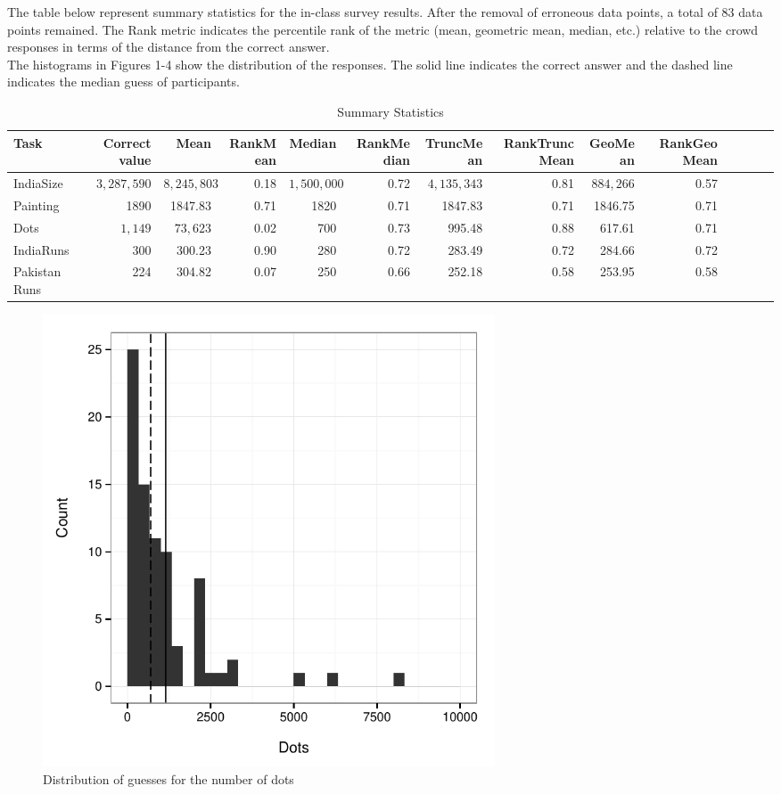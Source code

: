 \documentclass{article}
\begin{document}
The table below represent summary statistics for the in-class survey results. After the removal of erroneous data points, a total of 83 data points remained. The Rank metric indicates the percentile rank of the metric (mean, geometric mean, median, etc.) relative to the crowd responses in terms of the distance from the correct answer. \\

The histograms in Figures 1-4 show the distribution of the responses. The solid line indicates the correct answer and the dashed line indicates the median guess of participants.


\begin{table}[h]
\begin{adjustbox}{max width=\textwidth}
\begin{tabular}{|l||r|r||r|r|r|r|r|r|r|r|r|r|r}
\hline
Task & Correct value & Mean & RankMean & Median & RankMedian & TruncMean & RankTruncMean & GeoMean & RankGeoMean \\
\hline
IndiaSize & $3,287,590$ & $8,245,803$ & 0.18 & $1,500,000$ & 0.72 & $4,135,343$ & 0.81 & $884,266$ & 0.57 \\
Painting & 1890 & 1847.83 & 0.71 & 1820 & 0.71 & 1847.83 & 0.71 & 1846.75 & 0.71 \\
Dots & $1,149$ & $73,623$ & 0.02 & 700 & 0.73 & 995.48 & 0.88 & 617.61 & 0.71\\
IndiaRuns & 300 & 300.23 & 0.90 & 280 & 0.72 & 283.49 &     0.72 & 284.66 & 0.72\\
PakistanRuns & 224 & 304.82 & 0.07 & 250 & 0.66 &     252.18 & 0.58 & 253.95 & 0.58  \\
\hline
\end{tabular}
\end{adjustbox}
\caption{Summary Statistics}
\label{stats}
\end{table} 


				
\newpage

\begin{figure}
\begin{center}
\includegraphics[width=0.65\textwidth]{../../output/inClass_exp/dots.pdf}
\caption{Distribution of guesses for the number of dots}
\label{nrDots}
\end{center}	
\end{figure}
\end{document}
